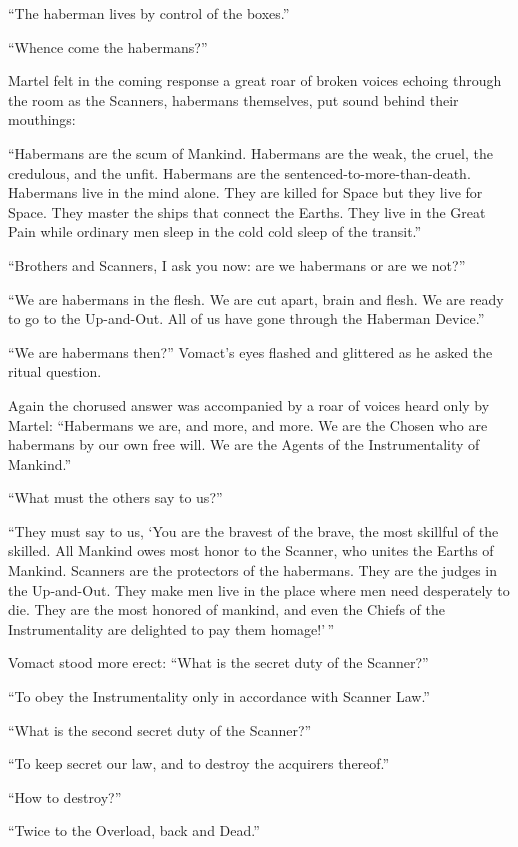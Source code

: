 ``The haberman lives by control of the boxes.''

``Whence come the habermans?''

Martel felt in the coming response a great roar of broken voices echoing through the room as the Scanners, habermans themselves, put sound behind their mouthings:

``Habermans are the scum of Mankind. Habermans are the weak, the cruel, the credulous, and the unfit. Habermans are the sentenced-to-more-than-death. Habermans live in the mind alone. They are killed for Space but they live for Space. They master the ships that connect the Earths. They live in the Great Pain while ordinary men sleep in the cold cold sleep of the transit.''

``Brothers and Scanners, I ask you now: are we habermans or are we not?''

``We are habermans in the flesh. We are cut apart, brain and flesh. We are ready to go to the Up-and-Out. All of us have gone through the Haberman Device.''

``We are habermans then?'' Vomact's eyes flashed and glittered as he asked the ritual question.

Again the chorused answer was accompanied by a roar of voices heard only by Martel: ``Habermans we are, and more, and more. We are the Chosen who are habermans by our own free will. We are the Agents of the Instrumentality of Mankind.''

``What must the others say to us?''

``They must say to us, `You are the bravest of the brave, the most skillful of the skilled. All Mankind owes most honor to the Scanner, who unites the Earths of Mankind. Scanners are the protectors of the habermans. They are the judges in the Up-and-Out. They make men live in the place where men need desperately to die. They are the most honored of mankind, and even the Chiefs of the Instrumentality are delighted to pay them homage!'\,''

Vomact stood more erect: ``What is the secret duty of the Scanner?''

``To obey the Instrumentality only in accordance with Scanner Law.''

``What is the second secret duty of the Scanner?''

``To keep secret our law, and to destroy the acquirers thereof.''

``How to destroy?''

``Twice to the Overload, back and Dead.''

